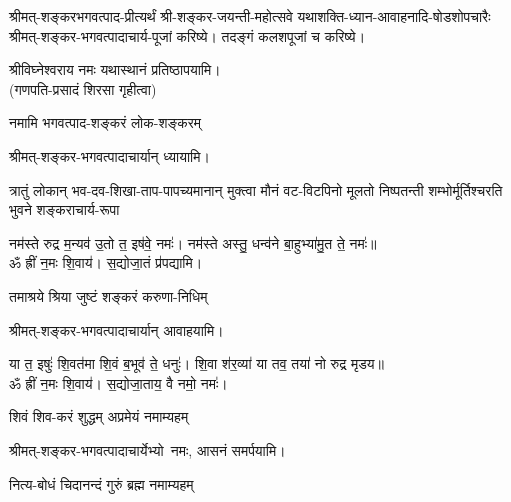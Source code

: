 श्रीमत्-शङ्करभगवत्पाद-प्रीत्यर्थं
श्री-शङ्कर-जयन्ती-महोत्सवे
यथाशक्ति-ध्यान-आवाहनादि-षोडशो\-पचारैः श्रीमत्-शङ्कर-भगवत्पादाचार्य-पूजां करिष्ये। तदङ्गं कलशपूजां च करिष्ये।

श्रीविघ्नेश्वराय नमः यथास्थानं प्रतिष्ठापयामि।\\
(गणपति-प्रसादं शिरसा गृहीत्वा)
\renewcommand{\devaName}{श्रीमत्-शङ्कर-भगवत्पादाचार्याः}













\begin{center}


\begingroup
\centering
{}
{नमामि भगवत्पाद-शङ्करं लोक-शङ्करम्}


श्रीमत्-शङ्कर-भगवत्पादाचार्यान् ध्यायामि।

{त्रातुं लोकान् भव-दव-शिखा-ताप-पापच्यमानान्}
{मुक्त्वा मौनं वट-विटपिनो मूलतो निष्पतन्ती}
{शम्भोर्मूर्तिश्चरति भुवने शङ्कराचार्य-रूपा}

नम॑स्ते रुद्र म॒न्यव॑ उ॒तो त॒ इष॑वे॒ नमः॑। नम॑स्ते अस्तु॒ धन्व॑ने बा॒हुभ्या॑मु॒त ते॒ नमः॑॥\\
ॐ ह्रीं न॒मः शि॒वाय॑। स॒द्योजा॒तं प्र॑पद्यामि।

{तमाश्रये श्रिया जुष्टं शङ्करं करुणा-निधिम्}

श्रीमत्-शङ्कर-भगवत्पादाचार्यान् आवाहयामि।

या त॒ इषुः॑ शि॒वत॑मा शि॒वं ब॒भूव॑ ते॒ धनुः॑। शि॒वा श॑र॒व्या॑ या तव॒ तया॑ नो रुद्र मृडय॥\\
ॐ ह्रीं न॒मः शि॒वाय॑। स॒द्योजा॒ताय॒ वै नमो॒ नमः॑। 

{शिवं शिव-करं शुद्धम् अप्रमेयं नमाम्यहम्}

श्रीमत्-शङ्कर-भगवत्पादाचार्येभ्यो~नमः, आसनं समर्पयामि।

{नित्य-बोधं चिदानन्दं गुरुं ब्रह्म नमाम्यहम्}


\end{center}
